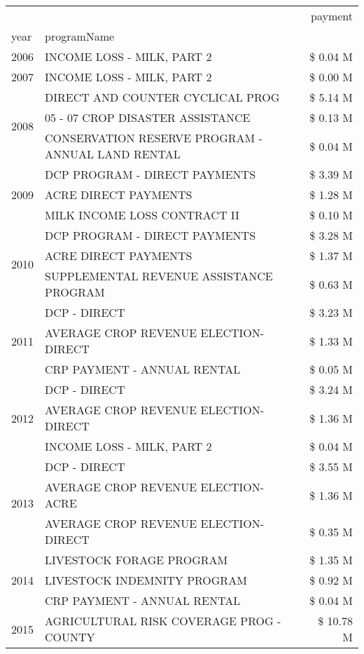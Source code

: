 \begin{tabular}{llr}
\toprule
 &  & payment \\
year & programName &  \\
\midrule
2006 & INCOME LOSS - MILK, PART 2 & \$ 0.04 M \\
\cline{1-3}
2007 & INCOME LOSS - MILK, PART 2 & \$ 0.00 M \\
\cline{1-3}
\multirow[t]{3}{*}{2008} & DIRECT AND COUNTER CYCLICAL PROG & \$ 5.14 M \\
 & 05 - 07 CROP DISASTER ASSISTANCE & \$ 0.13 M \\
 & CONSERVATION RESERVE PROGRAM - ANNUAL LAND RENTAL & \$ 0.04 M \\
\cline{1-3}
\multirow[t]{3}{*}{2009} & DCP PROGRAM - DIRECT PAYMENTS & \$ 3.39 M \\
 & ACRE DIRECT PAYMENTS & \$ 1.28 M \\
 & MILK INCOME LOSS CONTRACT II & \$ 0.10 M \\
\cline{1-3}
\multirow[t]{3}{*}{2010} & DCP PROGRAM - DIRECT PAYMENTS & \$ 3.28 M \\
 & ACRE DIRECT PAYMENTS & \$ 1.37 M \\
 & SUPPLEMENTAL REVENUE ASSISTANCE PROGRAM & \$ 0.63 M \\
\cline{1-3}
\multirow[t]{3}{*}{2011} & DCP - DIRECT & \$ 3.23 M \\
 & AVERAGE CROP REVENUE ELECTION-DIRECT & \$ 1.33 M \\
 & CRP PAYMENT - ANNUAL RENTAL & \$ 0.05 M \\
\cline{1-3}
\multirow[t]{3}{*}{2012} & DCP - DIRECT & \$ 3.24 M \\
 & AVERAGE CROP REVENUE ELECTION-DIRECT & \$ 1.36 M \\
 & INCOME LOSS - MILK, PART 2 & \$ 0.04 M \\
\cline{1-3}
\multirow[t]{3}{*}{2013} & DCP - DIRECT & \$ 3.55 M \\
 & AVERAGE CROP REVENUE ELECTION-ACRE & \$ 1.36 M \\
 & AVERAGE CROP REVENUE ELECTION-DIRECT & \$ 0.35 M \\
\cline{1-3}
\multirow[t]{3}{*}{2014} & LIVESTOCK FORAGE PROGRAM & \$ 1.35 M \\
 & LIVESTOCK INDEMNITY PROGRAM & \$ 0.92 M \\
 & CRP PAYMENT - ANNUAL RENTAL & \$ 0.04 M \\
\cline{1-3}
\multirow[t]{3}{*}{2015} & AGRICULTURAL RISK COVERAGE PROG - COUNTY & \$ 10.78 M \\

\end{tabular}
